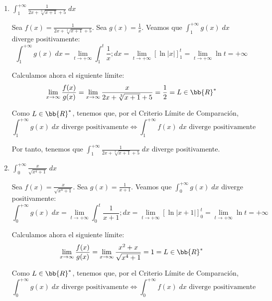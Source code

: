 \begin{ejercicio}
\begin{enumerate}
    \item $\displaystyle \int_1^{+\infty} \frac{1}{2x+\sqrt[3]{x+1} +5}\;dx$

    Sea $f(x)= \frac{1}{2x+\sqrt[3]{x+1} +5}$.
    Sea $g(x)=\frac{1}{x}$. Veamos que $\int_1^{+\infty} g(x)\;dx$ diverge positivamente:
    \begin{equation*}
        \int_1^{+\infty} g(x)\;dx
        = \lim_{t\to +\infty} \int_1^t \frac{1}{x};dx
        = \lim_{t\to +\infty} [\ln |x|]_1^t
        = \lim_{t\to +\infty} \ln t = +\infty
    \end{equation*}

    Calculamos ahora el siguiente límite:
    \begin{equation*}
        \lim_{x\to \infty} \frac{f(x)}{g(x)}
        = \lim_{x\to \infty} \frac{x}{{2x+\sqrt[3]{x+1} +5}} = \frac{1}{2}=L\in \bb{R}^\ast
    \end{equation*}
    
    Como $L\in \bb{R}^\ast$, tenemos que, por el Criterio Límite de Comparación,
    \begin{equation*}
        \int_1^{+\infty} g(x)\;dx \text{ diverge positivamente} \Longleftrightarrow 
        \int_1^{+\infty} f(x)\;dx \text{ diverge positivamente}
    \end{equation*}

    Por tanto, tenemos que  $\displaystyle \int_1^{+\infty} \frac{1}{2x+\sqrt[3]{x+1} +5}\;dx$ diverge positivamente.


    \item $\displaystyle \int_0^{+\infty} \frac{x}{\sqrt{x^4+1}}\;dx$

    Sea $f(x)= \frac{x}{\sqrt{x^4+1}}$.
    Sea $g(x)=\frac{1}{x+1}$. Veamos que $\int_0^{+\infty} g(x)\;dx$ diverge positivamente:
    \begin{equation*}
        \int_0^{+\infty} g(x)\;dx
        = \lim_{t\to +\infty} \int_0^t \frac{1}{x+1};dx
        = \lim_{t\to +\infty} [\ln |x+1|]_0^t
        = \lim_{t\to +\infty} \ln t = +\infty
    \end{equation*}

    Calculamos ahora el siguiente límite:
    \begin{equation*}
        \lim_{x\to \infty} \frac{f(x)}{g(x)}
        = \lim_{x\to \infty} \frac{x^2+x}{\sqrt{x^4+1}} = 1=L\in \bb{R}^\ast
    \end{equation*}
    
    Como $L\in \bb{R}^\ast$, tenemos que, por el Criterio Límite de Comparación,
    \begin{equation*}
        \int_0^{+\infty} g(x)\;dx \text{ diverge positivamente} \Longleftrightarrow 
        \int_0^{+\infty} f(x)\;dx \text{ diverge positivamente}
    \end{equation*}


\end{enumerate}
\end{ejercicio}
